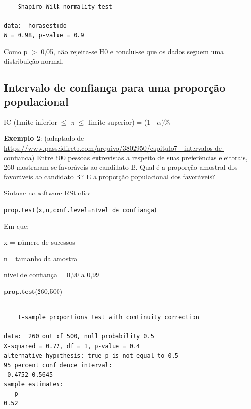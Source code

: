 \documentclass[12pt,brazil,oneside]{book}
\newenvironment{Shaded}{\begin{snugshade}}{\end{snugshade}}
\newcommand{\DecValTok}[1]{\textcolor[rgb]{0.00,0.00,0.81}{#1}}
\newcommand{\KeywordTok}[1]{\textcolor[rgb]{0.13,0.29,0.53}{\textbf{#1}}}
\newcommand{\NormalTok}[1]{#1}
\begin{document}
\begin{verbatim}

    Shapiro-Wilk normality test

data:  horasestudo
W = 0.98, p-value = 0.9
\end{verbatim}

Como p \(>\) 0,05, não rejeita-se H0 e conclui-se que os dados seguem
uma distribuição normal.

\hypertarget{intervalo-de-confianca-para-uma-proporcao-populacional}{%
\subsection{Intervalo de confiança para uma proporção
populacional}\label{intervalo-de-confianca-para-uma-proporcao-populacional}}

IC (limite inferior \(\leq\) \(\pi\) \(\leq\) limite superior) = (1 -
\(\alpha\))\%

\textbf{Exemplo 2}: (adaptado de
\url{https://www.passeidireto.com/arquivo/3802950/capitulo7---intervalos-de-confianca})
Entre 500 pessoas entrevistas a respeito de suas preferências
eleitorais, 260 mostraram-se favoráveis ao candidato B. Qual é a
proporção amostral dos favoráveis ao candidato B? E a proporção
populacional dos favoráveis?

Sintaxe no software RStudio:

\texttt{prop.test(x,n,conf.level=nível\ de\ confiança)}

Em que:

x = número de sucessos

n= tamanho da amostra

nível de confiança = 0,90 a 0,99

\begin{Shaded}
\begin{Highlighting}[]
\KeywordTok{prop.test}\NormalTok{(}\DecValTok{260}\NormalTok{,}\DecValTok{500}\NormalTok{)}
\end{Highlighting}
\end{Shaded}

\begin{verbatim}

    1-sample proportions test with continuity correction

data:  260 out of 500, null probability 0.5
X-squared = 0.72, df = 1, p-value = 0.4
alternative hypothesis: true p is not equal to 0.5
95 percent confidence interval:
 0.4752 0.5645
sample estimates:
   p 
0.52 
\end{verbatim}
\end{document}
